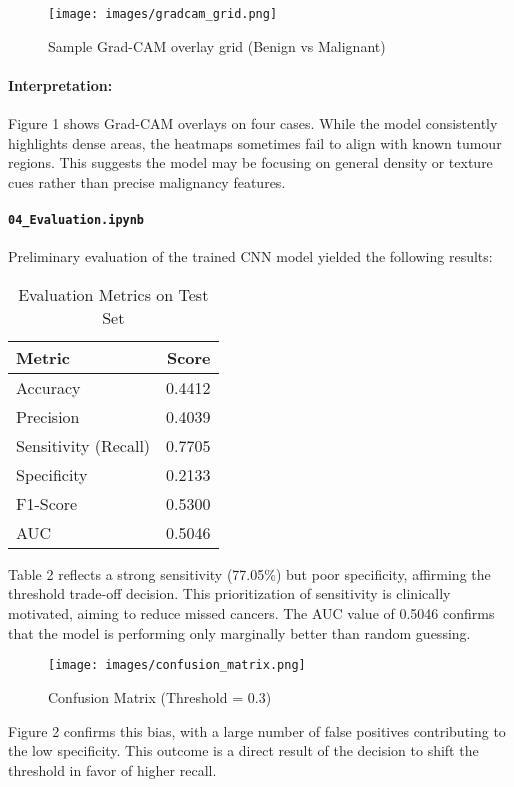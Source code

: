 \documentclass[12pt]{article}
\begin{document}
\begin{figure}[H]
\centering
\texttt{[image: images/gradcam\_grid.png]}
\caption{Sample Grad-CAM overlay grid (Benign vs Malignant)}
\end{figure}

\paragraph{Interpretation:}
Figure 1 shows Grad-CAM overlays on four cases. While the model consistently highlights dense areas, the heatmaps sometimes fail to align with known tumour regions. This suggests the model may be focusing on general density or texture cues rather than precise malignancy features.

\paragraph{\texttt{04\_Evaluation.ipynb}}
Preliminary evaluation of the trained CNN model yielded the following results:

\begin{table}[H]
\centering
\caption{Evaluation Metrics on Test Set}
\begin{tabular}{lr}
\toprule
Metric & Score \\
\midrule
Accuracy & 0.4412 \\
Precision & 0.4039 \\
Sensitivity (Recall) & 0.7705 \\
Specificity & 0.2133 \\
F1-Score & 0.5300 \\
AUC & 0.5046 \\
\bottomrule
\end{tabular}
\end{table}

Table 2 reflects a strong sensitivity (77.05\%) but poor specificity, affirming the threshold trade-off decision. This prioritization of sensitivity is clinically motivated, aiming to reduce missed cancers. The AUC value of 0.5046 confirms that the model is performing only marginally better than random guessing.

\begin{figure}[H]
\centering
\texttt{[image: images/confusion\_matrix.png]}
\caption{Confusion Matrix (Threshold = 0.3)}
\end{figure}
Figure 2 confirms this bias, with a large number of false positives contributing to the low specificity. This outcome is a direct result of the decision to shift the threshold in favor of higher recall.
\end{document}
